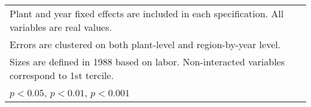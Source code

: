 \begin{table}[htbp]
\begin{tabular}{l*{6}{c}}
\multicolumn{7}{l}{\footnotesize Plant and year fixed effects are included in each specification. All variables are real values.}\\
\multicolumn{7}{l}{\footnotesize Errors are clustered on both plant-level and region-by-year level.}\\
\multicolumn{7}{l}{\footnotesize Sizes are defined in 1988 based on labor. Non-interacted variables correspond to 1st tercile.}\\
\multicolumn{7}{l}{\footnotesize \sym{*} \(p<0.05\), \sym{**} \(p<0.01\), \sym{***} \(p<0.001\)}\\
\end{tabular}
\end{table}
